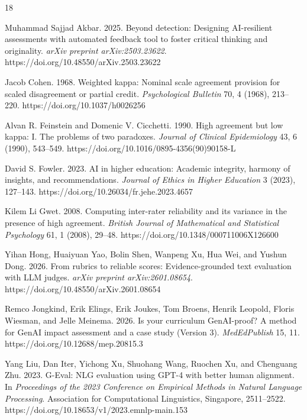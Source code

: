\documentclass[sigconf]{acmart}
\begin{document}
\begin{thebibliography}{18}

Muhammad Sajjad Akbar. 2025. Beyond detection: Designing AI-resilient assessments with automated feedback tool to foster critical thinking and originality. \emph{arXiv preprint arXiv:2503.23622}. https://doi.org/10.48550/arXiv.2503.23622

Jacob Cohen. 1968. Weighted kappa: Nominal scale agreement provision for scaled disagreement or partial credit. \emph{Psychological Bulletin} 70, 4 (1968), 213--220. https://doi.org/10.1037/h0026256

Alvan R. Feinstein and Domenic V. Cicchetti. 1990. High agreement but low kappa: I. The problems of two paradoxes. \emph{Journal of Clinical Epidemiology} 43, 6 (1990), 543--549. https://doi.org/10.1016/0895-4356(90)90158-L

David S. Fowler. 2023. AI in higher education: Academic integrity, harmony of insights, and recommendations. \emph{Journal of Ethics in Higher Education} 3 (2023), 127--143. https://doi.org/10.26034/fr.jehe.2023.4657

Kilem Li Gwet. 2008. Computing inter-rater reliability and its variance in the presence of high agreement. \emph{British Journal of Mathematical and Statistical Psychology} 61, 1 (2008), 29--48. https://doi.org/10.1348/000711006X126600

Yihan Hong, Huaiyuan Yao, Bolin Shen, Wanpeng Xu, Hua Wei, and Yushun Dong. 2026. From rubrics to reliable scores: Evidence-grounded text evaluation with LLM judges. \emph{arXiv preprint arXiv:2601.08654}. https://doi.org/10.48550/arXiv.2601.08654

Remco Jongkind, Erik Elings, Erik Joukes, Tom Broens, Henrik Leopold, Floris Wiesman, and Jelle Meinema. 2026. Is your curriculum GenAI-proof? A method for GenAI impact assessment and a case study (Version 3). \emph{MedEdPublish} 15, 11. https://doi.org/10.12688/mep.20815.3

Yang Liu, Dan Iter, Yichong Xu, Shuohang Wang, Ruochen Xu, and Chenguang Zhu. 2023. G-Eval: NLG evaluation using GPT-4 with better human alignment. In \emph{Proceedings of the 2023 Conference on Empirical Methods in Natural Language Processing}. Association for Computational Linguistics, Singapore, 2511--2522. https://doi.org/10.18653/v1/2023.emnlp-main.153


\end{thebibliography}
\end{document}
